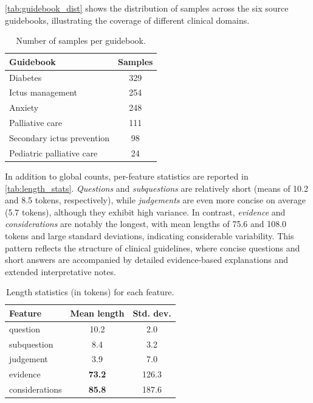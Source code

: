 \documentclass[11pt,a4paper]{article}
\begin{document}
\autoref{tab:guidebook_dist} shows the distribution of samples across the six source guidebooks, illustrating the coverage of different clinical domains.

\begin{table}[H]
    \centering
    \begin{tabular}{lc}
\toprule
\textbf{Guidebook} & \textbf{Samples} \\
\midrule
Diabetes & 329 \\
Ictus management  & 254 \\
Anxiety & 248 \\
Palliative care & 111 \\
Secondary ictus prevention & 98 \\
Pediatric palliative care & 24 \\
\bottomrule
\end{tabular}
    \caption{Number of samples per guidebook.}
    \label{tab:guidebook_dist}
\end{table}

In addition to global counts, per-feature statistics are reported in \autoref{tab:length_stats}. \textit{Questions} and \textit{subquestions} are relatively short (means of 10.2 and 8.5 tokens, respectively), while \textit{judgements} are even more concise on average (5.7 tokens), although they exhibit high variance. In contrast, \textit{evidence} and \textit{considerations} are notably the longest, with mean lengths of 75.6 and 108.0 tokens and large standard deviations, indicating considerable variability. This pattern reflects the structure of clinical guidelines, where concise questions and short answers are accompanied by detailed evidence-based explanations and extended interpretative notes. 

\begin{table}[H]
    \centering
    \begin{tabular}{lcc}
\toprule
\textbf{Feature} & \textbf{Mean length} & \textbf{Std. dev.} \\
\midrule
question & 10.2 & 2.0 \\
subquestion & 8.4 & 3.2 \\
judgement & 3.9 & 7.0 \\
evidence & \textbf{73.2} & 126.3 \\
considerations & \textbf{85.8} & 187.6 \\
\bottomrule
\end{tabular}
    \caption{Length statistics (in tokens) for each feature.}
    \label{tab:length_stats}
\end{table}
\end{document}
